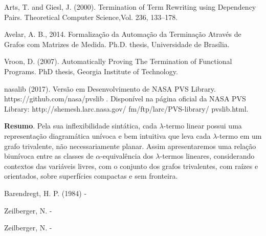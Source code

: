 %	
	\begin{thebibliography}{999}
	
	\bibitem{} Arts, T. and Giesl, J. (2000). Termination of Term Rewriting using Dependency Pairs. Theoretical Computer Science,Vol. 236, 133–178.

	\bibitem{} Avelar, A. B., 2014. Formalização da Automação da Terminação Através de Grafos com Matrizes de Medida. Ph.D. thesis, Universidade de Brasília.  

	\bibitem{} Vroon, D. (2007). Automatically Proving The Termination of Functional Programs. PhD thesis, Georgia Institute of Technology.

	\bibitem{} nasalib (2017). Versão em Desenvolvimento de NASA PVS Library. https://github.com/nasa/pvslib . Disponível na página oficial da NASA PVS Library: http://shemesh.larc.nasa.gov/ fm/ftp/larc/PVS-library/ pvslib.html.
	\end{thebibliography}
	\vspace{24pt}
    

	
	
	\noindent\textbf{Resumo}.\label{bad} 
	Pela sua inflexibilidade sintática, cada $\lambda$-termo linear possui uma representação diagramática unívoca e bem intuitiva que leva cada $\lambda$-termo em um grafo trivalente, não necessariamente planar.        
	Assim apresentaremos uma relação biunívoca entre as classes de $\alpha$-equivalência dos $\lambda$-termos lineares, considerando contextos das variáveis livres, com o conjunto dos grafos trivalentes, com raízes e orientados, sobre superfícies compactas e sem fronteira.
	
	\begin{thebibliography}{999}
		 Barendregt, H. P. (1984)  -  
		
		 Zeilberger, N. -  
		
		 Zeilberger, N. -  
	\end{thebibliography}

